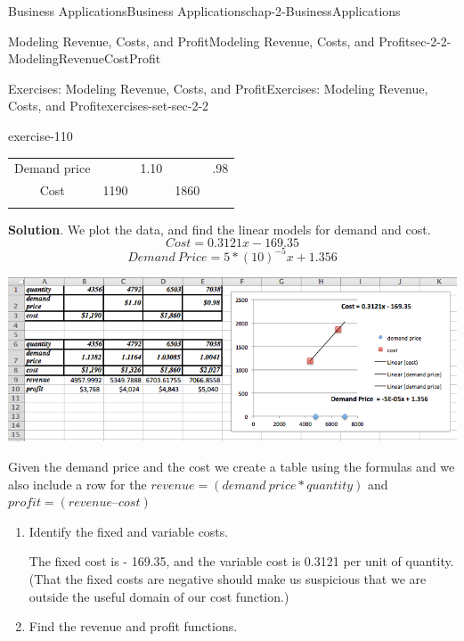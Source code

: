 \documentclass[oneside,10pt,]{book}
\numberwithin{equation}{section}
\newcommand{\hrulemedium}{\noalign{\hrule height 0.07em}}
\begin{document}
\begin{chapterptx}{Business Applications}{}{Business Applications}{}{}{chap-2-BusinessApplications}
\begin{sectionptx}{Modeling Revenue, Costs, and Profit}{}{Modeling Revenue, Costs, and Profit}{}{}{sec-2-2-ModelingRevenueCostProfit}
\begin{exercises-subsection-numberless}{Exercises: Modeling Revenue, Costs, and Profit}{}{Exercises: Modeling Revenue, Costs, and Profit}{}{}{exercises-set-sec-2-2}
\begin{exercisegroup}
\begin{divisionexerciseeg}{7}{}{}{exercise-110}
\begin{sidebyside}{1}{0}{0}{0}
\begin{sbspanel}{1}
{\begin{tabular}{ccccc}
Demand price&&\textdollar{}1.10&&\textdollar{}.98\tabularnewline\hrulemedium
Cost&\textdollar{}1190&&\textdollar{}1860&\tabularnewline\hrulemedium
\end{tabular}
\par}
\end{sbspanel}%
\end{sidebyside}%
\par\smallskip%
\noindent\textbf{Solution}.\hypertarget{solution-53}{}\quad%
\hypertarget{p-730}{}%
We plot the data, and find the linear models for demand and cost.%
%
\begin{equation*}
Cost=0.3121 x-169.35
\end{equation*}
%
\begin{equation*}
Demand\ Price= 5*(10)^{-5}  x+1.356
\end{equation*}
\begin{sidebyside}{1}{0}{0}{0}%
\begin{sbspanel}{1}%
\includegraphics[width=1\linewidth]{images/sec2-2-sol7a.png}
\end{sbspanel}%
\end{sidebyside}%
\par
\hypertarget{p-731}{}%
Given the demand price and the cost we create a table using the formulas and we also include a row for the \(revenue =( demand\ price * quantity)\) and \(profit =(revenue – cost)\)%
\leavevmode%
\begin{enumerate}[label=(\alph*)]
\item\hypertarget{li-211}{}\hypertarget{p-732}{}%
Identify the fixed and variable costs.%
\par
\hypertarget{p-733}{}%
The fixed cost is - \textdollar{}169.35, and the variable cost is \textdollar{}0.3121 per unit of quantity.  (That the fixed costs are negative should make us suspicious that we are outside the useful domain of our cost function.)%
\item\hypertarget{li-212}{}\hypertarget{p-734}{}%
Find the revenue and profit functions.%
%
\begin{equation*}

\end{equation*}
\end{enumerate}
\end{divisionexerciseeg}
\end{exercisegroup}
\end{exercises-subsection-numberless}
\end{sectionptx}
\end{chapterptx}
\end{document}
